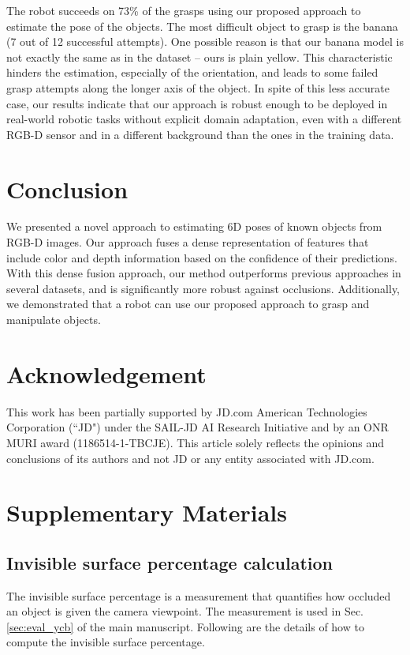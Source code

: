 \documentclass[10pt,twocolumn,letterpaper]{article}
\begin{document}
The robot succeeds on 73\% of the grasps using our proposed approach to estimate the pose of the objects. The most difficult object to grasp is the banana (7 out of 12 successful attempts). One possible reason is that our banana model is not exactly the same as in the dataset -- ours is plain yellow. This characteristic hinders the estimation, especially of the orientation, and leads to some failed grasp attempts along the longer axis of the object. In spite of this less accurate case, our results indicate that our approach is robust enough to be deployed in real-world robotic tasks without explicit domain adaptation, even with a different RGB-D sensor and in a different background than the ones in the training data.

\section{Conclusion}

We presented a novel approach to estimating 6D poses of known objects from RGB-D images. Our approach fuses a dense representation of features that include color and depth information based on the confidence of their predictions. With this dense fusion approach, our method outperforms previous approaches in several datasets, and is significantly more robust against occlusions. Additionally, we demonstrated that a robot can use our proposed approach to grasp and manipulate objects. 

\section*{Acknowledgement}
This work has been partially supported by JD.com American Technologies Corporation (``JD") under the SAIL-JD AI Research Initiative and by an ONR MURI award (1186514-1-TBCJE). This article solely reflects the opinions and conclusions of its authors and not JD or any entity associated with JD.com.

\printbibliography

\newpage

\section{Supplementary Materials}

\subsection{Invisible surface percentage calculation}
The invisible surface percentage is a measurement that quantifies how occluded an object is given the camera viewpoint. The measurement is used in Sec.\ref{sec:eval_ycb} of the main manuscript. Following are the details of how to compute the invisible surface percentage.
\end{document}

